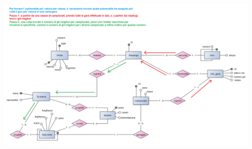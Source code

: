 \documentclass[a4paper,12pt]{report}
\begin{document}
		\begin{center}
				\hspace*{-2cm}%
				\includegraphics[width=\dimexpr\textwidth+10cm\relax, height=17cm, angle=90]{copies/navigazioneClassifica.png}%
				\hspace*{-4cm}%
			\end{center}
\end{document}
